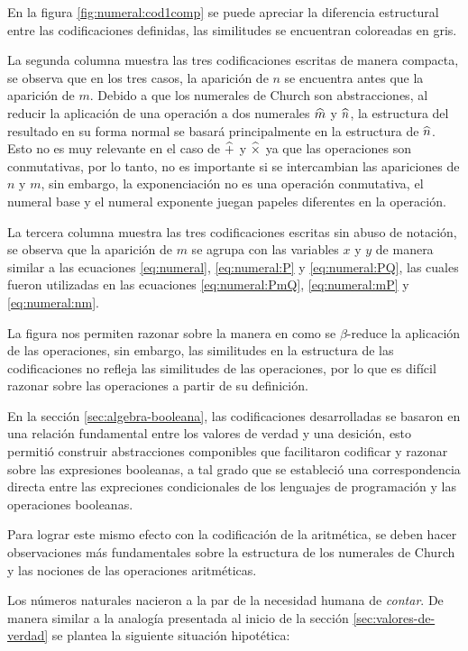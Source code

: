 En la figura \ref{fig:numeral:cod1comp} se puede apreciar la diferencia estructural entre las codificaciones definidas, las similitudes se encuentran coloreadas en gris.

La segunda columna muestra las tres codificaciones escritas de manera compacta, se observa que en los tres casos, la aparición de \( n \) se encuentra antes que la aparición de \( m \). Debido a que los numerales de Church son abstracciones, al reducir la aplicación de una operación a dos numerales \( \widehat{m} \) y \( \widehat{n} \), la estructura del resultado en su forma normal se basará principalmente en la estructura de \( \widehat{n} \). Esto no es muy relevante en el caso de \( \widehat{+} \) y \( \widehat{\times} \) ya que las operaciones son conmutativas, por lo tanto, no es importante si se intercambian las apariciones de \( n \) y \( m \), sin embargo, la exponenciación no es una operación conmutativa, el numeral base y el numeral exponente juegan papeles diferentes en la operación.

La tercera columna muestra las tres codificaciones escritas sin abuso de notación, se observa que la aparición de \( m \) se agrupa con las variables \( x \) y \( y \) de manera similar a las ecuaciones \eqref{eq:numeral}, \eqref{eq:numeral:P} y \eqref{eq:numeral:PQ}, las cuales fueron utilizadas en las ecuaciones \eqref{eq:numeral:PmQ}, \eqref{eq:numeral:mP} y \eqref{eq:numeral:nm}.

La figura nos permiten razonar sobre la manera en como se \( β \)-reduce la aplicación de las operaciones, sin embargo, las similitudes en la estructura de las codificaciones no refleja las similitudes de las operaciones, por lo que es difícil razonar sobre las operaciones a partir de su definición.

En la sección \ref{sec:algebra-booleana}, las codificaciones desarrolladas se basaron en una relación fundamental entre los valores de verdad y una desición, esto permitió construir abstracciones componibles que facilitaron codificar y razonar sobre las expresiones booleanas, a tal grado que se estableció una correspondencia directa entre las expreciones condicionales de los lenguajes de programación y las operaciones booleanas.

Para lograr este mismo efecto con la codificación de la aritmética, se deben hacer observaciones más fundamentales sobre la estructura de los numerales de Church y las nociones de las operaciones aritméticas.

Los números naturales nacieron a la par de la necesidad humana de \emph{contar}. De manera similar a la analogía presentada al inicio de la sección \ref{sec:valores-de-verdad} se plantea la siguiente situación hipotética:

